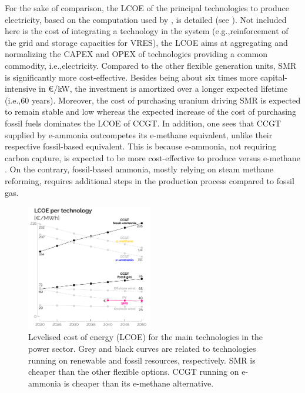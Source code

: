 \documentclass[11pt,twoside,a4paper,english]{article}
\def\eg{e.g.,}
\def\ie{i.e.,}
\begin{document}
\begin{appendices}
For the sake of comparison, the \gls{LCOE} of the principal technologies to produce electricity, based on the computation used by \citet{limpens2021generating}, is detailed (see ). Not included here is the cost of integrating a technology in the system (\eg reinforcement of the grid and storage capacities for \gls{VRES}), the \gls{LCOE} aims at aggregating and normalizing the CAPEX and OPEX of technologies providing a common commodity, \ie electricity. Compared to the other flexible generation units, \gls{SMR} is significantly more cost-effective. Besides being about six times more capital-intensive in €/kW, the investment is amortized over a longer expected lifetime (\ie 60 years). Moreover, the cost of purchasing uranium driving \gls{SMR} is expected to remain stable and low whereas the expected increase of the cost of purchasing fossil fuels dominates the \gls{LCOE} of \gls{CCGT}. In addition, one sees that \gls{CCGT} supplied by e-ammonia outcompetes its e-methane equivalent, unlike their respective fossil-based equivalent. This is because e-ammonia, not requiring carbon capture, is expected to be more cost-effective to produce versus e-methane \cite{h2coalition}. On the contrary, fossil-based ammonia, mostly relying on steam methane reforming, requires additional steps in the production process compared to fossil gas.

\begin{figure}[htbp!]
\centering
\includegraphics[width=0.49\textwidth]{LCOE_line_2.pdf}
\caption{Levelised cost of energy (LCOE) for the main technologies in the power sector. Grey and black curves are related to technologies running on renewable and fossil resources, respectively. \gls{SMR} is cheaper than the other flexible options. \gls{CCGT} running on e-ammonia is cheaper than its e-methane alternative.}
\label{fig:LCOE}
\end{figure}


\end{appendices}
\end{document}
